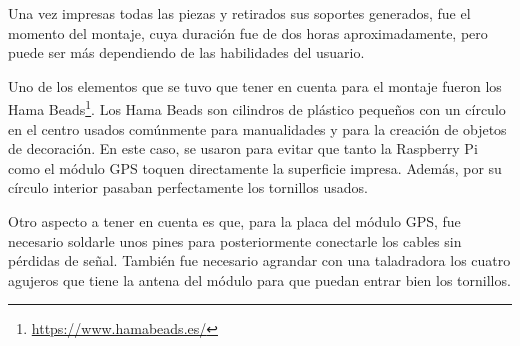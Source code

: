 Una vez impresas todas las piezas y retirados sus soportes generados, fue el momento del montaje, cuya duración fue de dos horas aproximadamente, pero puede ser más dependiendo de las habilidades del usuario.

Uno de los elementos que se tuvo que tener en cuenta para el montaje fueron los Hama Beads\footnote{\url{https://www.hamabeads.es/}}. Los Hama Beads son cilindros de plástico pequeños con un círculo en el centro usados comúnmente para manualidades y para la creación de objetos de decoración. En este caso, se usaron para evitar que tanto la Raspberry Pi como el módulo GPS toquen directamente la superficie impresa. Además, por su círculo interior pasaban perfectamente los tornillos usados. 





Otro aspecto a tener en cuenta es que, para la placa del módulo GPS, fue necesario soldarle unos pines para posteriormente conectarle los cables sin pérdidas de señal. También fue necesario agrandar con una taladradora los cuatro agujeros que tiene la antena del módulo para que puedan entrar bien los tornillos. 


